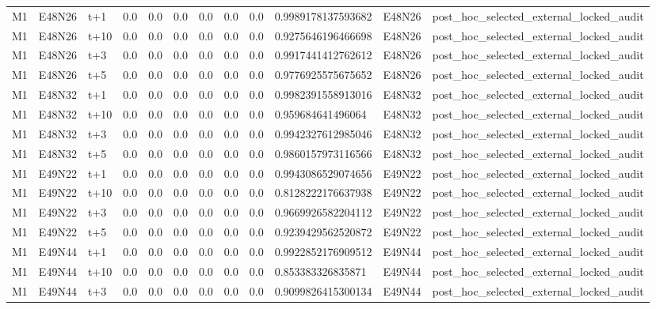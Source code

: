 \begin{landscape}
\begin{longtable}{llllllllllll}
M1 & E48N26 & t+1 & 0.0 & 0.0 & 0.0 & 0.0 & 0.0 & 0.0 & 0.9989178137593682 & E48N26 & post\_hoc\_selected\_external\_locked\_audit \\
M1 & E48N26 & t+10 & 0.0 & 0.0 & 0.0 & 0.0 & 0.0 & 0.0 & 0.9275646196466698 & E48N26 & post\_hoc\_selected\_external\_locked\_audit \\
M1 & E48N26 & t+3 & 0.0 & 0.0 & 0.0 & 0.0 & 0.0 & 0.0 & 0.9917441412762612 & E48N26 & post\_hoc\_selected\_external\_locked\_audit \\
M1 & E48N26 & t+5 & 0.0 & 0.0 & 0.0 & 0.0 & 0.0 & 0.0 & 0.9776925575675652 & E48N26 & post\_hoc\_selected\_external\_locked\_audit \\
M1 & E48N32 & t+1 & 0.0 & 0.0 & 0.0 & 0.0 & 0.0 & 0.0 & 0.9982391558913016 & E48N32 & post\_hoc\_selected\_external\_locked\_audit \\
M1 & E48N32 & t+10 & 0.0 & 0.0 & 0.0 & 0.0 & 0.0 & 0.0 & 0.959684641496064 & E48N32 & post\_hoc\_selected\_external\_locked\_audit \\
M1 & E48N32 & t+3 & 0.0 & 0.0 & 0.0 & 0.0 & 0.0 & 0.0 & 0.9942327612985046 & E48N32 & post\_hoc\_selected\_external\_locked\_audit \\
M1 & E48N32 & t+5 & 0.0 & 0.0 & 0.0 & 0.0 & 0.0 & 0.0 & 0.9860157973116566 & E48N32 & post\_hoc\_selected\_external\_locked\_audit \\
M1 & E49N22 & t+1 & 0.0 & 0.0 & 0.0 & 0.0 & 0.0 & 0.0 & 0.9943086529074656 & E49N22 & post\_hoc\_selected\_external\_locked\_audit \\
M1 & E49N22 & t+10 & 0.0 & 0.0 & 0.0 & 0.0 & 0.0 & 0.0 & 0.8128222176637938 & E49N22 & post\_hoc\_selected\_external\_locked\_audit \\
M1 & E49N22 & t+3 & 0.0 & 0.0 & 0.0 & 0.0 & 0.0 & 0.0 & 0.9669926582204112 & E49N22 & post\_hoc\_selected\_external\_locked\_audit \\
M1 & E49N22 & t+5 & 0.0 & 0.0 & 0.0 & 0.0 & 0.0 & 0.0 & 0.9239429562520872 & E49N22 & post\_hoc\_selected\_external\_locked\_audit \\
M1 & E49N44 & t+1 & 0.0 & 0.0 & 0.0 & 0.0 & 0.0 & 0.0 & 0.9922852176909512 & E49N44 & post\_hoc\_selected\_external\_locked\_audit \\
M1 & E49N44 & t+10 & 0.0 & 0.0 & 0.0 & 0.0 & 0.0 & 0.0 & 0.853383326835871 & E49N44 & post\_hoc\_selected\_external\_locked\_audit \\
M1 & E49N44 & t+3 & 0.0 & 0.0 & 0.0 & 0.0 & 0.0 & 0.0 & 0.9099826415300134 & E49N44 & post\_hoc\_selected\_external\_locked\_audit \\

\end{longtable}
\end{landscape}
